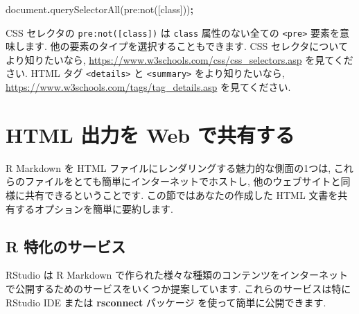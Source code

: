 \documentclass[
  11pt,
  lualatex,ja=standard,jafont=noto]{bxjsreport}
\newenvironment{Shaded}{\begin{snugshade}}{\end{snugshade}}
\newcommand{\BuiltInTok}[1]{#1}
\newcommand{\FunctionTok}[1]{\textcolor[rgb]{0.00,0.00,0.00}{#1}}
\newcommand{\NormalTok}[1]{#1}
\newcommand{\OperatorTok}[1]{\textcolor[rgb]{0.81,0.36,0.00}{\textbf{#1}}}
\newcommand{\StringTok}[1]{\textcolor[rgb]{0.31,0.60,0.02}{#1}}
\begin{document}
\begin{Shaded}
\begin{Highlighting}[]
\BuiltInTok{document}\OperatorTok{.}\FunctionTok{querySelectorAll}\NormalTok{(}\StringTok{\textquotesingle{}pre:not([class])\textquotesingle{}}\NormalTok{)}\OperatorTok{;}
\end{Highlighting}
\end{Shaded}

CSS セレクタの \texttt{pre:not({[}class{]})} は \texttt{class} 属性のない全ての \texttt{\textless{}pre\textgreater{}} 要素を意味します. 他の要素のタイプを選択することもできます. CSS セレクタについてより知りたいなら, \url{https://www.w3schools.com/css/css_selectors.asp} を見てください. HTML タグ \texttt{\textless{}details\textgreater{}} と \texttt{\textless{}summary\textgreater{}} をより知りたいなら, \url{https://www.w3schools.com/tags/tag_details.asp} を見てください.

\hypertarget{html-share}{%
\section{HTML 出力を Web で共有する}\label{html-share}}

R Markdown を HTML ファイルにレンダリングする魅力的な側面の1つは, これらのファイルをとても簡単にインターネットでホストし, 他のウェブサイトと同様に共有できるということです. この節ではあなたの作成した HTML 文書を共有するオプションを簡単に要約します.

\hypertarget{r-specific-services}{%
\subsection{R 特化のサービス}\label{r-specific-services}}

RStudio は R Markdown で作られた様々な種類のコンテンツをインターネットで公開するためのサービスをいくつか提案しています. これらのサービスは特に RStudio IDE または \textbf{rsconnect} パッケージ \autocite{R-rsconnect} を使って簡単に公開できます.
\end{document}
